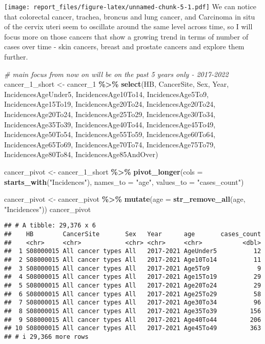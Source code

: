 \documentclass[
]{article}
\newenvironment{Shaded}{\begin{snugshade}}{\end{snugshade}}
\newcommand{\AttributeTok}[1]{\textcolor[rgb]{0.13,0.29,0.53}{#1}}
\newcommand{\CommentTok}[1]{\textcolor[rgb]{0.56,0.35,0.01}{\textit{#1}}}
\newcommand{\FunctionTok}[1]{\textcolor[rgb]{0.13,0.29,0.53}{\textbf{#1}}}
\newcommand{\NormalTok}[1]{#1}
\newcommand{\OtherTok}[1]{\textcolor[rgb]{0.56,0.35,0.01}{#1}}
\newcommand{\SpecialCharTok}[1]{\textcolor[rgb]{0.81,0.36,0.00}{\textbf{#1}}}
\newcommand{\StringTok}[1]{\textcolor[rgb]{0.31,0.60,0.02}{#1}}
\begin{document}
\texttt{[image: report\_files/figure-latex/unnamed-chunk-5-1.pdf]} We can
notice that colorectal cancer, trachea, broncus and lung cancer, and
Carcinoma in situ of the cervix uteri seem to oscillate around the same
level across time, so I will focus more on those cancers that show a
growing trend in terms of number of cases over time - skin cancers,
breast and prostate cancers and explore them further.

\begin{Shaded}
\begin{Highlighting}[]
\CommentTok{\# main focus from now on will be on the past 5 years only {-} 2017{-}2022}
\NormalTok{cancer\_1\_short }\OtherTok{\textless{}{-}}\NormalTok{ cancer\_1 }\SpecialCharTok{\%\textgreater{}\%} \FunctionTok{select}\NormalTok{(HB, CancerSite, Sex, Year, IncidencesAgeUnder5, IncidencesAge10To14, IncidencesAge5To9, IncidencesAge15To19, IncidencesAge20To24, IncidencesAge20To24, IncidencesAge20To24, IncidencesAge25To29, IncidencesAge30To34, IncidencesAge35To39, IncidencesAge40To44, IncidencesAge45To49, IncidencesAge50To54, IncidencesAge55To59, IncidencesAge60To64, IncidencesAge65To69, IncidencesAge70To74, IncidencesAge75To79, IncidencesAge80To84, IncidencesAge85AndOver)}

\NormalTok{cancer\_pivot }\OtherTok{\textless{}{-}}\NormalTok{ cancer\_1\_short }\SpecialCharTok{\%\textgreater{}\%} \FunctionTok{pivot\_longer}\NormalTok{(}\AttributeTok{cols =} \FunctionTok{starts\_with}\NormalTok{(}\StringTok{"Incidences"}\NormalTok{), }\AttributeTok{names\_to =} \StringTok{"age"}\NormalTok{, }\AttributeTok{values\_to =} \StringTok{"cases\_count"}\NormalTok{)}

\NormalTok{cancer\_pivot }\OtherTok{\textless{}{-}}\NormalTok{ cancer\_pivot }\SpecialCharTok{\%\textgreater{}\%} \FunctionTok{mutate}\NormalTok{(}\AttributeTok{age =} \FunctionTok{str\_remove\_all}\NormalTok{(age, }\StringTok{"Incidences"}\NormalTok{))}
\NormalTok{cancer\_pivot}
\end{Highlighting}
\end{Shaded}

\begin{verbatim}
## # A tibble: 29,376 x 6
##    HB        CancerSite       Sex   Year      age       cases_count
##    <chr>     <chr>            <chr> <chr>     <chr>           <dbl>
##  1 S08000015 All cancer types All   2017-2021 AgeUnder5          12
##  2 S08000015 All cancer types All   2017-2021 Age10To14          11
##  3 S08000015 All cancer types All   2017-2021 Age5To9             9
##  4 S08000015 All cancer types All   2017-2021 Age15To19          29
##  5 S08000015 All cancer types All   2017-2021 Age20To24          29
##  6 S08000015 All cancer types All   2017-2021 Age25To29          58
##  7 S08000015 All cancer types All   2017-2021 Age30To34          96
##  8 S08000015 All cancer types All   2017-2021 Age35To39         156
##  9 S08000015 All cancer types All   2017-2021 Age40To44         206
## 10 S08000015 All cancer types All   2017-2021 Age45To49         363
## # i 29,366 more rows
\end{verbatim}
\end{document}
